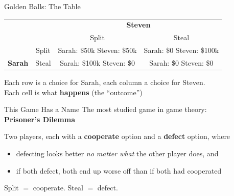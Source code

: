 \begin{frame}{Golden Balls: The Table}
\centering
\begin{tabular}{cc|c|c|}
\cline{3-4}
& & \multicolumn{2}{c|}{\textbf{Steven}} \\
\cline{3-4}
& & Split & Steal \\
\cline{2-4}
\multicolumn{1}{c|}{} & \multicolumn{1}{|c|}{Split}
  & \makecell{Sarah: \$50k\\Steven: \$50k}
  & \makecell{Sarah: \$0\\Steven: \$100k} \\
\cline{2-4}
\multicolumn{1}{c|}{\textbf{Sarah}} & \multicolumn{1}{|c|}{Steal}
  & \makecell{Sarah: \$100k\\Steven: \$0}
  & \makecell{Sarah: \$0\\Steven: \$0} \\
\cline{2-4}
\end{tabular}
\bsk

\raggedright
Each row is a choice for Sarah, each column a choice for Steven.\\
Each cell is what \textbf{happens} (the ``outcome'')
\vfill
\end{frame}

\begin{frame}{This Game Has a Name}
\vfill
\centering
\large
The most studied game in game theory:\\
\bsk
\textbf{Prisoner's Dilemma}
\bsk
\normalsize
\raggedright
Two players, each with a \textbf{cooperate} option and a \textbf{defect} option, where
\begin{itemize}
    \item defecting looks better \textit{no matter what} the other player does, and
    \item if both defect, both end up worse off than if both had cooperated
\end{itemize}
\vfill
Split $=$ cooperate. \hspace{0.2in} Steal $=$ defect.
\vspace{-0.3in}
\end{frame}

